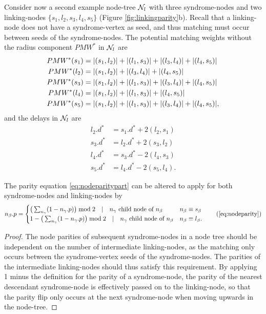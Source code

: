 Consider now a second example node-tree $\mathcal{N}_l$ with three syndrome-nodes and two linking-nodes $\{s_1, l_2, s_3, l_4, s_5\}$ (Figure \ref{fig:linkingparity}b). Recall that a linking-node does not have a syndrome-vertex as seed, and thus matching must occur between seeds of the syndrome-nodes. The potential matching weights without the radius component $PMW^*$ in $\mathcal{N}_l$ are
\begin{align*}
  PMW^*(s_1) &= \abs{(s_1, l_2)} + \abs{(l_1, s_3)} + \abs{(l_3, l_4)} + \abs{(l_4, s_5)} \\
  PMW^*(l_2) &= \abs{(s_1, l_2)} + \abs{(l_3, l_4)} + \abs{(l_4, s_5)} \\
  PMW^*(s_3) &= \abs{(s_1, l_2)} + \abs{(l_1, s_3)} + \abs{(l_3, l_4)} + \abs{(l_4, s_5)} \\
  PMW^*(l_4) &= \abs{(s_1, l_2)} + \abs{(l_1, s_3)} + \abs{(l_4, s_5)} \\
  PMW^*(s_5) &= \abs{(s_1, l_2)} + \abs{(l_1, s_3)} + \abs{(l_3, l_4)} + \abs{(l_4, s_5)},
\end{align*}
and the delays in $\mathcal{N}_l$ are 
\begin{align*}
  l_2.d^* &= s_1.d^* + 2(l_2, s_1)\\
  s_3.d^* &= l_2.d^* + 2(s_3, l_2)\\
  l_4.d^* &= s_3.d^* - 2(l_4, s_3)\\
  s_5.d^* &= l_4.d^* - 2(s_5, l_4).
\end{align*}

\begin{lemma}\label{lem:nodeparity}
  The parity equation \eqref{eq:nodeparitypart} can be altered to apply for both syndrome-nodes and linking-nodes by   
  \begin{equation}
    n_\beta.p =
    \begin{cases}
      \big( \sum_{n_\gamma} (1-n_\gamma.p) \big ) \bmod 2 \hspace{1em} | \hspace{1em} n_\gamma \text{ child node of } n_\beta & n_\beta \equiv s_\beta \\
      1 - \big( \sum_{n_\gamma} (1-n_\gamma.p) \big ) \bmod 2 \hspace{1em} | \hspace{1em} n_\gamma \text{ child node of } n_\beta & n_\beta \equiv l_\beta.
    \end{cases}\tag{\ref{eq:nodeparity}}
  \end{equation}
\end{lemma}
\begin{proof}
  The node parities of subsequent syndrome-nodes in a node tree should be independent on the number of intermediate linking-nodes, as the matching only occurs between the syndrome-vertex seeds of the syndrome-nodes. The parities of the intermediate linking-nodes should thus satisfy this requirement. By applying 1 minus the definition for the parity of a syndrome-node, the parity of the nearest descendant syndrome-node is effectively passed on to the linking-node, so that the parity flip only occurs at the next syndrome-node when moving upwards in the node-tree. 
\end{proof}

